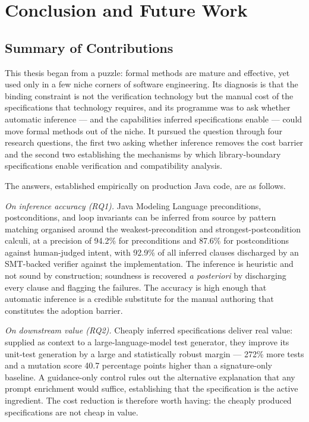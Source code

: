 \chapter{Conclusion and Future Work}
\label{ch:conclusion}

\section{Summary of Contributions}

This thesis began from a puzzle: formal methods are mature and effective, yet used
only in a few niche corners of software engineering. Its diagnosis is that the
binding constraint is not the verification technology but the manual cost of the
specifications that technology requires, and its programme was to ask whether
automatic inference --- and the capabilities inferred specifications enable ---
could move formal methods out of the niche. It pursued the question through four
research questions, the first two asking whether inference removes the cost barrier
and the second two establishing the mechanisms by which library-boundary
specifications enable verification and compatibility analysis.

The answers, established empirically on production Java code, are as follows.

\emph{On inference accuracy (RQ1).} Java Modeling Language preconditions,
postconditions, and loop invariants can be inferred from source by pattern matching
organised around the weakest-precondition and strongest-postcondition calculi, at a
precision of 94.2\% for preconditions and 87.6\% for postconditions against
human-judged intent, with 92.9\% of all inferred clauses discharged by an
SMT-backed verifier against the implementation. The inference is heuristic and not
sound by construction; soundness is recovered \emph{a posteriori} by discharging
every clause and flagging the failures. The accuracy is high enough that automatic
inference is a credible substitute for the manual authoring that constitutes the
adoption barrier.

\emph{On downstream value (RQ2).} Cheaply inferred specifications deliver real
value: supplied as context to a large-language-model test generator, they improve
its unit-test generation by a large and statistically robust margin --- 272\% more
tests and a mutation score 40.7 percentage points higher than a signature-only
baseline. A guidance-only control rules out the alternative explanation that any
prompt enrichment would suffice, establishing that the specification is the active
ingredient. The cost reduction is therefore worth having: the cheaply produced
specifications are not cheap in value.

